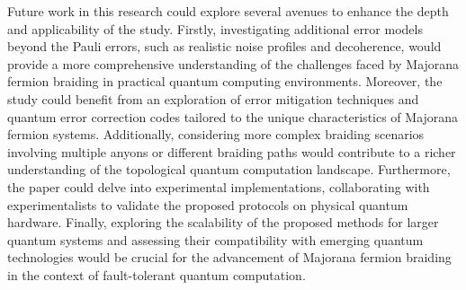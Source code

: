 \documentclass{article}
\begin{document}
\vspace{12pt}
Future work in this research could explore several avenues to enhance the depth and applicability of the study. Firstly, investigating additional error models beyond the Pauli errors, such as realistic noise profiles and decoherence, would provide a more comprehensive understanding of the challenges faced by Majorana fermion braiding in practical quantum computing environments. Moreover, the study could benefit from an exploration of error mitigation techniques and quantum error correction codes tailored to the unique characteristics of Majorana fermion systems. Additionally, considering more complex braiding scenarios involving multiple anyons or different braiding paths would contribute to a richer understanding of the topological quantum computation landscape. Furthermore, the paper could delve into experimental implementations, collaborating with experimentalists to validate the proposed protocols on physical quantum hardware. Finally, exploring the scalability of the proposed methods for larger quantum systems and assessing their compatibility with emerging quantum technologies would be crucial for the advancement of Majorana fermion braiding in the context of fault-tolerant quantum computation.

\newpage



\newpage
\appendix
\end{document}
